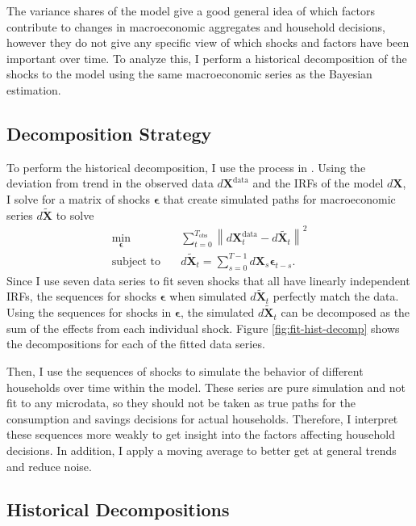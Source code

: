 The variance shares of the model give a good general idea of which factors contribute to changes in macroeconomic aggregates and household decisions, however they do not give any specific view of which shocks and factors have been important over time. To analyze this, I perform a historical decomposition of the shocks to the model using the same macroeconomic series as the Bayesian estimation.


\subsection{Decomposition Strategy}

To perform the historical decomposition, I use the process in \textcite{auclert2023estimating}. Using the deviation from trend in the observed data $d\mathbf{X}^\text{data}$ and the IRFs of the model $d \mathbf{X}$, I solve for a matrix of shocks $\boldsymbol{\epsilon}$ that create simulated paths for macroeconomic series $d \tilde{\mathbf{X}}$ to solve
\begin{align*}
    \min_{\boldsymbol{\epsilon}} \quad & \sum_{t = 0}^{T_\text{obs}} \left\| d\mathbf{X}_t^\text{data} - d \tilde{\mathbf{X}_t} \right\|^2 \\
    \text{subject to} \quad & d \tilde{\mathbf{X}}_t = \sum_{s = 0}^{T-1} d\mathbf{X}_s \boldsymbol{\epsilon}_{t-s}.
\end{align*}
Since I use seven data series to fit seven shocks that all have linearly independent IRFs, the sequences for shocks $\boldsymbol{\epsilon}$ when simulated $d \tilde{\mathbf{X}}_t$ perfectly match the data. Using the sequences for shocks in $\boldsymbol{\epsilon}$, the simulated $d \tilde{\mathbf{X}}_t$ can be decomposed as the sum of the effects from each individual shock. Figure \ref{fig:fit-hist-decomp} shows the decompositions for each of the fitted data series.

Then, I use the sequences of shocks to simulate the behavior of different households over time within the model. These series are pure simulation and not fit to any microdata, so they should not be taken as true paths for the consumption and savings decisions for actual households. Therefore, I interpret these sequences more weakly to get insight into the factors affecting household decisions. In addition, I apply a moving average to better get at general trends and reduce noise.


\subsection{Historical Decompositions}

